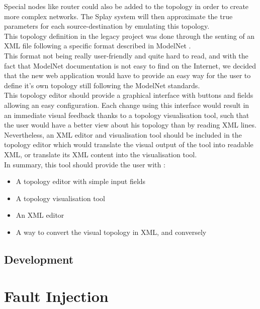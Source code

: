 \documentclass{eplmastersthesis}
\begin{document}
        Special nodes like router could also be added to the topology in order
        to create more complex networks. The Splay system will then
        approximate the true parameters for each source-destination by
        emulating this topology.\\

        This topology definition in the legacy project was done through
        the senting of an XML file following a specific format described
        in ModelNet \cite{ModelNet}.\\
        This format not being really user-friendly and quite hard to read,
        and with the fact that ModelNet documentation is not easy to find
        on the Internet, we decided that the new web application would have
        to provide an easy way for the user to define it's own topology
        still following the ModelNet standards.\\

        This topology editor should provide a graphical interface with
        buttons and fields allowing an easy configuration. Each change
        using this interface would result in an immediate visual feedback
        thanks to a topology visualisation tool, such that the user would
        have a better view about his topology than by reading XML lines.
        Nevertheless, an XML editor and visualisation tool should be included
        in the topology editor which would translate the visual output of
        the tool into readable XML, or translate its XML content into the
        visualisation tool.\\

        In summary, this tool should provide the user with :

        \begin{itemize}
          \item A topology editor with simple input fields
          \item A topology visualisation tool
          \item An XML editor
          \item A way to convert the visual topology in XML, and conversely
        \end{itemize}
      \subsection{Development}

    \section{Fault Injection}
\end{document}
